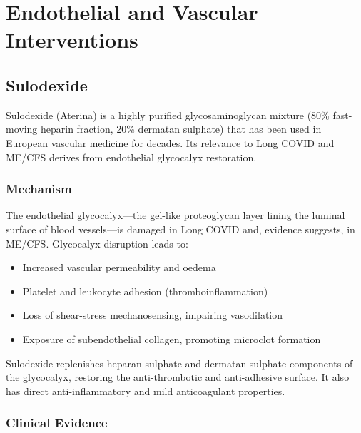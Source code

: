 \section{Endothelial and Vascular Interventions}
\label{sec:endothelial-vascular}

\subsection{Sulodexide}
\label{subsec:sulodexide}

Sulodexide (Aterina) is a highly purified glycosaminoglycan mixture (80\% fast-moving heparin fraction, 20\% dermatan sulphate) that has been used in European vascular medicine for decades. Its relevance to Long COVID and ME/CFS derives from endothelial glycocalyx restoration.

\subsubsection{Mechanism}

The endothelial glycocalyx---the gel-like proteoglycan layer lining the luminal surface of blood vessels---is damaged in Long COVID and, evidence suggests, in ME/CFS. Glycocalyx disruption leads to:
\begin{itemize}
    \item Increased vascular permeability and oedema
    \item Platelet and leukocyte adhesion (thromboinflammation)
    \item Loss of shear-stress mechanosensing, impairing vasodilation
    \item Exposure of subendothelial collagen, promoting microclot formation
\end{itemize}
Sulodexide replenishes heparan sulphate and dermatan sulphate components of the glycocalyx, restoring the anti-thrombotic and anti-adhesive surface. It also has direct anti-inflammatory and mild anticoagulant properties.

\subsubsection{Clinical Evidence}

